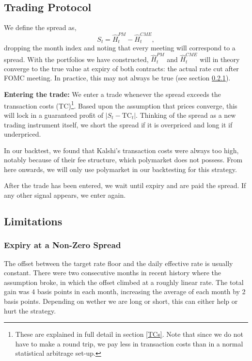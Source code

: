 \subsection{Trading Protocol}

We define the spread as,
\begin{equation}
    S_{t} = \widehat{H}^{PM}_{t} - \widehat{H}^{CME}_{t},
\end{equation}
dropping the month index and noting that every meeting will correspond to a spread. With the portfolios we have constructed, $\widehat{H}^{PM}_{t}$ and $\widehat{H}^{CME}_{t}$ will in theory converge to the true value at expiry of both contracts: the actual rate cut after FOMC meeting. In practice, this may not always be true (see section \ref{effrswing}).

\textbf{Entering the trade:} 
We enter a trade whenever the spread exceeds the transaction costs (TC)\footnote{These are explained in full detail in section \ref{TCs}. Note that since we do not have to make a round trip, we pay less in transaction costs than in a normal statistical arbitrage set-up.}. Based upon the assumption that prices converge, this will lock in a guaranteed profit of $|S_t - \text{TC}_t|$. Thinking of the spread as a new trading instrument itself, we short the spread if it is overpriced and long it if underpriced.

In our backtest, we found that Kalshi's transaction costs were always too high, notably because of their fee structure, which polymarket does not possess. From here onwards, we will only use polymarket in our backtesting for this strategy.

After the trade has been entered, we wait until expiry and are paid the spread. If any other signal appears, we enter again.

\subsection{Limitations}
\subsubsection{Expiry at a Non-Zero Spread}
\label{effrswing}
The offset between the target rate floor and the daily effective rate is usually constant. There were two consecutive months in recent history where the assumption broke, in which the offset climbed at a roughly linear rate. The total gain was 4 basis points in each month, increasing the average of each month by 2 basis points. Depending on wether we are long or short, this can either help or hurt the strategy.

